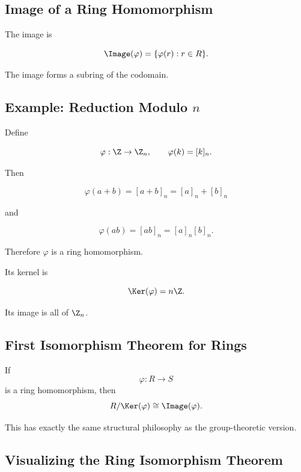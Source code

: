 \subsection{Image of a Ring Homomorphism}
\label{subsec:ring-image}

The image is

\[ \Image(\varphi)=\{\varphi(r):r\in R\}. \]

The image forms a subring of the codomain.

\subsection{Example: Reduction Modulo \(n\)}
\label{subsec:ring-reduction-homomorphism}

Define

\[ \varphi:\Z\to\Z_n,\qquad\varphi(k)=[k]_n. \]

Then

\[ \varphi(a+b)=[a+b]_n=[a]_n+[b]_n \]

and

\[ \varphi(ab)=[ab]_n=[a]_n[b]_n. \]

Therefore \(\varphi\) is a ring homomorphism.

Its kernel is

\[ \Ker(\varphi)=n\Z. \]

Its image is all of \(\Z_n\).

\subsection{First Isomorphism Theorem for Rings}
\label{subsec:first-isomorphism-ring}

\begin{theorem}
If
\[ \varphi:R\to S \]
is a ring homomorphism, then
\[ R/\Ker(\varphi)\cong\Image(\varphi). \]
\end{theorem}

This has exactly the same structural philosophy as the group-theoretic
version.

\subsection{Visualizing the Ring Isomorphism Theorem}
\label{subsec:visual-ring-isomorphism}

